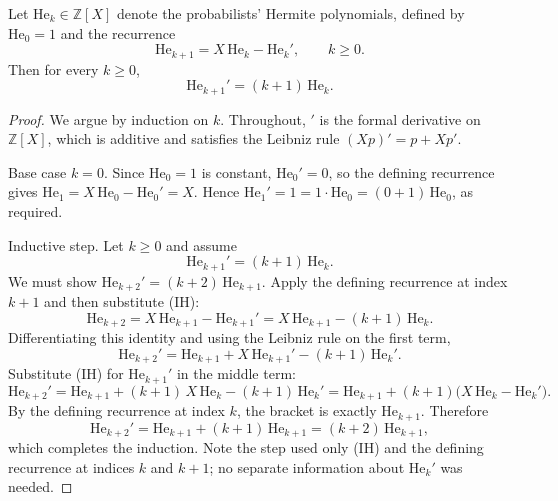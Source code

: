 \begin{lemma}
Let $\mathrm{He}_k \in \mathbb{Z}[X]$ denote the probabilists' Hermite polynomials,
defined by $\mathrm{He}_0 = 1$ and the recurrence
\[
  \mathrm{He}_{k+1} = X\,\mathrm{He}_k - \mathrm{He}_k' ,
  \qquad k \geq 0 .
\]
Then for every $k \geq 0$,
\[
  \mathrm{He}_{k+1}' = (k+1)\,\mathrm{He}_k .
\]
\end{lemma}
\begin{proof}
We argue by induction on $k$.  Throughout, $'$ is the formal derivative on
$\mathbb{Z}[X]$, which is additive and satisfies the Leibniz rule
$(Xp)' = p + X p'$.

Base case $k = 0$.  Since $\mathrm{He}_0 = 1$ is constant, $\mathrm{He}_0' = 0$, so the
defining recurrence gives
$\mathrm{He}_1 = X\,\mathrm{He}_0 - \mathrm{He}_0' = X$.  Hence
$\mathrm{He}_1' = 1 = 1\cdot \mathrm{He}_0 = (0+1)\,\mathrm{He}_0$, as required.

Inductive step.  Let $k \geq 0$ and assume
\[
  \mathrm{He}_{k+1}' = (k+1)\,\mathrm{He}_k . \tag{IH}
\]
We must show $\mathrm{He}_{k+2}' = (k+2)\,\mathrm{He}_{k+1}$.  Apply the defining
recurrence at index $k+1$ and then substitute (IH):
\[
  \mathrm{He}_{k+2} = X\,\mathrm{He}_{k+1} - \mathrm{He}_{k+1}'
            = X\,\mathrm{He}_{k+1} - (k+1)\,\mathrm{He}_k .
\]
Differentiating this identity and using the Leibniz rule on the first term,
\[
  \mathrm{He}_{k+2}'
    = \mathrm{He}_{k+1} + X\,\mathrm{He}_{k+1}' - (k+1)\,\mathrm{He}_k' .
\]
Substitute (IH) for $\mathrm{He}_{k+1}'$ in the middle term:
\[
  \mathrm{He}_{k+2}'
    = \mathrm{He}_{k+1} + (k+1)\,X\,\mathrm{He}_k - (k+1)\,\mathrm{He}_k'
    = \mathrm{He}_{k+1} + (k+1)\bigl(X\,\mathrm{He}_k - \mathrm{He}_k'\bigr) .
\]
By the defining recurrence at index $k$, the bracket is exactly
$\mathrm{He}_{k+1}$.  Therefore
\[
  \mathrm{He}_{k+2}' = \mathrm{He}_{k+1} + (k+1)\,\mathrm{He}_{k+1} = (k+2)\,\mathrm{He}_{k+1},
\]
which completes the induction.  Note the step used only (IH) and the defining
recurrence at indices $k$ and $k+1$; no separate information about
$\mathrm{He}_k'$ was needed.
\end{proof}

